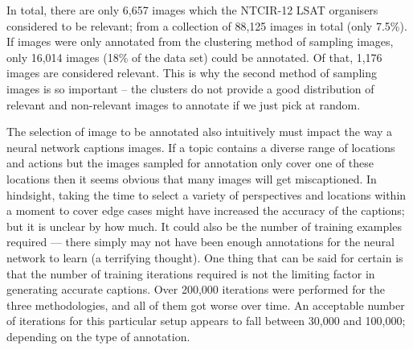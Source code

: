 In total, there are only 6,657 images which the NTCIR-12 LSAT organisers considered to be relevant; from a collection of 88,125 images in total (only 7.5\%). If images were only annotated from the clustering method of sampling images, only 16,014 images (18\% of the data set) could be annotated. Of that, 1,176 images are considered relevant. This is why the second method of sampling images is so important -- the clusters do not provide a good distribution of relevant and non-relevant images to annotate if we just pick at random.





The selection of image to be annotated also intuitively must impact the way a neural network captions images. If a topic contains a diverse range of locations and actions but the images sampled for annotation only cover one of these locations then it seems obvious that many images will get miscaptioned. In hindsight, taking the time to select a variety of perspectives and locations within a moment to cover edge cases might have increased the accuracy of the captions; but it is unclear by how much. It could also be the number of training examples required --- there simply may not have been enough annotations for the neural network to learn (a terrifying thought). One thing that can be said for certain is that the number of training iterations required is not the limiting factor in generating accurate captions. Over 200,000 iterations were performed for the three methodologies, and all of them got worse over time. An acceptable number of iterations for this particular setup appears to fall between 30,000 and 100,000; depending on the type of annotation.

